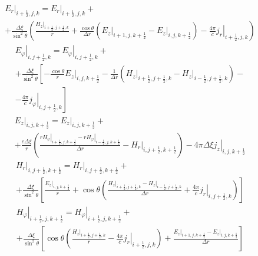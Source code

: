 \documentclass[a4paper]{article}
\begin{document}
%	
	\begin{multline*}
		\left.E_{r}\right|_{i+\frac{1}{2},j,k}=\left.E_{r}\right|_{i+\frac{1}{2},j,k}+\\+\frac{\Delta\xi}{\sin^{2}\theta}\left(\frac{\left.H_{z}\right|_{i+\frac{1}{2},j+\frac{1}{2},k}}{r}+\frac{\cos\theta}{\Delta r}\left(\left.E_{z}\right|_{i+1,j,k+\frac{1}{2}}-\left.E_{z}\right|_{i,j,k+\frac{1}{2}}\right)-\frac{4\pi}{c}\left.j_{r}\right|_{i+\frac{1}{2},j,k}\right)
	\end{multline*}
	\begin{multline*}
		\left.E_{\varphi}\right|_{i,j+\frac{1}{2},k}=\left.E_{\varphi}\right|_{i,j+\frac{1}{2},k}+\\
		+\frac{\Delta\xi}{\sin^{2}\theta}\left[-\frac{\cos\theta}{r}\left.E_{z}\right|_{i,j,k+\frac{1}{2}}-\frac{1}{\Delta r}\left(\left.H_{z}\right|_{i+\frac{1}{2},j+\frac{1}{2},k}-\left.H_{z}\right|_{i-\frac{1}{2},j+\frac{1}{2},k}\right)-\right.\\
		\left.-\frac{4\pi}{c}\left.j_{\varphi}\right|_{i,j+\frac{1}{2},k} \right]		
	\end{multline*}
	\begin{multline*}
		\left.E_{z}\right|_{i,j,k+\frac{1}{2}}=\left.E_{z}\right|_{i,j,k+\frac{1}{2}}+\\+\frac{c\Delta\xi}{r}\left(\frac{\left.rH_{\varphi}\right|_{i+\frac{1}{2},j,k+\frac{1}{2}}-\left.rH_{\varphi}\right|_{i-\frac{1}{2},j,k+\frac{1}{2}}}{\Delta r}-\left.H_{r}\right|_{i,j+\frac{1}{2},k+\frac{1}{2}}\right)-\left.4\pi\Delta\xi j_{z}\right|_{i,j,k+\frac{1}{2}}
	\end{multline*}
%
	\begin{multline*}
		\left.H_{r}\right|_{i,j+\frac{1}{2},k+\frac{1}{2}}=\left.H_{r}\right|_{i,j+\frac{1}{2},k+\frac{1}{2}}+\\
		+\frac{\Delta\xi}{\sin^{2}\theta}\left[\frac{\left.E_{z}\right|_{i,j,k+\frac{1}{2}}}{r}+\cos\theta\left(\frac{\left.H_{z}\right|_{i+\frac{1}{2},j+\frac{1}{2},k}-\left.H_{z}\right|_{i-\frac{1}{2},j+\frac{1}{2},k}}{\Delta r}+\frac{4\pi}{c}\left.j_{r}\right|_{i,j+\frac{1}{2},k}\right)\right]
	\end{multline*}
	\begin{multline*}
		\left.H_{\varphi}\right|_{i+\frac{1}{2},j,k+\frac{1}{2}}=\left.H_{\varphi}\right|_{i+\frac{1}{2},j,k+\frac{1}{2}}+\\
		+\frac{\Delta\xi}{\sin^{2}\theta}\left[\cos\theta\left(\frac{\left.H_{z}\right|_{i+\frac{1}{2},j+\frac{1}{2},k}}{r}-\frac{4\pi}{c}\left.j_{r}\right|_{i+\frac{1}{2},j,k}\right)+\frac{\left.E_{z}\right|_{i+1,j,k+\frac{1}{2}}-\left.E_{z}\right|_{i,j,k+\frac{1}{2}}}{\Delta r}\right]
	\end{multline*}
\end{document}
